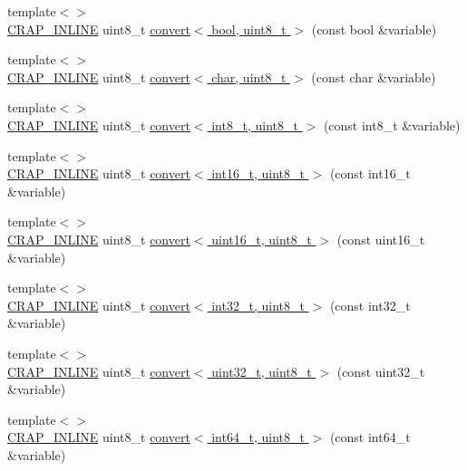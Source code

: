 \begin{DoxyCompactItemize}
\item 
{\footnotesize template$<$$>$ }\\\hyperlink{config__x86_8h_a5a40526b8d842e7ff731509998bb0f1c}{C\+R\+A\+P\+\_\+\+I\+N\+L\+I\+N\+E} uint8\+\_\+t \hyperlink{namespacecrap_a415eb57c20641aeeccc125acea0ca91e}{convert$<$ bool, uint8\+\_\+t $>$} (const bool \&variable)
\item 
{\footnotesize template$<$$>$ }\\\hyperlink{config__x86_8h_a5a40526b8d842e7ff731509998bb0f1c}{C\+R\+A\+P\+\_\+\+I\+N\+L\+I\+N\+E} uint8\+\_\+t \hyperlink{namespacecrap_a28d731469eb316297452b37b8d924408}{convert$<$ char, uint8\+\_\+t $>$} (const char \&variable)
\item 
{\footnotesize template$<$$>$ }\\\hyperlink{config__x86_8h_a5a40526b8d842e7ff731509998bb0f1c}{C\+R\+A\+P\+\_\+\+I\+N\+L\+I\+N\+E} uint8\+\_\+t \hyperlink{namespacecrap_a7a03815a8615d59811b1b92f6ba456e4}{convert$<$ int8\+\_\+t, uint8\+\_\+t $>$} (const int8\+\_\+t \&variable)
\item 
{\footnotesize template$<$$>$ }\\\hyperlink{config__x86_8h_a5a40526b8d842e7ff731509998bb0f1c}{C\+R\+A\+P\+\_\+\+I\+N\+L\+I\+N\+E} uint8\+\_\+t \hyperlink{namespacecrap_afdda55be48d0315d4351964701ab4554}{convert$<$ int16\+\_\+t, uint8\+\_\+t $>$} (const int16\+\_\+t \&variable)
\item 
{\footnotesize template$<$$>$ }\\\hyperlink{config__x86_8h_a5a40526b8d842e7ff731509998bb0f1c}{C\+R\+A\+P\+\_\+\+I\+N\+L\+I\+N\+E} uint8\+\_\+t \hyperlink{namespacecrap_a93a5a7c93915258bf8d7e05fa0382a31}{convert$<$ uint16\+\_\+t, uint8\+\_\+t $>$} (const uint16\+\_\+t \&variable)
\item 
{\footnotesize template$<$$>$ }\\\hyperlink{config__x86_8h_a5a40526b8d842e7ff731509998bb0f1c}{C\+R\+A\+P\+\_\+\+I\+N\+L\+I\+N\+E} uint8\+\_\+t \hyperlink{namespacecrap_a7bf2ca74b9a25ac0fff83d73ef210bad}{convert$<$ int32\+\_\+t, uint8\+\_\+t $>$} (const int32\+\_\+t \&variable)
\item 
{\footnotesize template$<$$>$ }\\\hyperlink{config__x86_8h_a5a40526b8d842e7ff731509998bb0f1c}{C\+R\+A\+P\+\_\+\+I\+N\+L\+I\+N\+E} uint8\+\_\+t \hyperlink{namespacecrap_a8a30e9eaae2d141ce3d7f781317d3e80}{convert$<$ uint32\+\_\+t, uint8\+\_\+t $>$} (const uint32\+\_\+t \&variable)
\item 
{\footnotesize template$<$$>$ }\\\hyperlink{config__x86_8h_a5a40526b8d842e7ff731509998bb0f1c}{C\+R\+A\+P\+\_\+\+I\+N\+L\+I\+N\+E} uint8\+\_\+t \hyperlink{namespacecrap_ad80e6334907104f1c991228799801d70}{convert$<$ int64\+\_\+t, uint8\+\_\+t $>$} (const int64\+\_\+t \&variable)

\end{DoxyCompactItemize}
